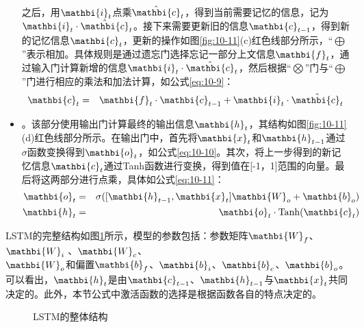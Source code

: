 \begin{itemize}
之后，用$\mathbi{i}_t$点乘$\hat{\mathbi{c}}_t$，得到当前需要记忆的信息，记为$\mathbi{i}_t \cdot  \hat{\mathbi{c}}_t$。接下来需要更新旧的信息$\mathbi{c}_{t-1}$，得到新的记忆信息$\mathbi{c}_t$，更新的操作如图\ref{fig:10-11}(c)红色线部分所示，“$\bigoplus$”表示相加。具体规则是通过遗忘门选择忘记一部分上文信息$\mathbi{f}_t$，通过输入门计算新增的信息$\mathbi{i}_t \cdot  \hat{\mathbi{c}}_t$，然后根据“$\bigotimes$”门与“$\bigoplus$”门进行相应的乘法和加法计算，如公式\eqref{eq:10-9}：
\begin{eqnarray}
\mathbi{c}_t &=& \mathbi{f}_t \cdot \mathbi{c}_{t-1} + \mathbi{i}_t  \cdot \hat{\mathbi{c}_t}
\label{eq:10-9}
\end{eqnarray}
\vspace{-1.0em}
\item {\small{}}。该部分使用输出门计算最终的输出信息$\mathbi{h}_t$，其结构如图\ref{fig:10-11}(d)红色线部分所示。在输出门中，首先将$\mathbi{x}_t$和$\mathbi{h}_{t-1}$通过$\sigma$函数变换得到$\mathbi{o}_t$，如公式\eqref{eq:10-10}。其次，将上一步得到的新记忆信息$\mathbi{c}_t$通过Tanh函数进行变换，得到值在[-1，1]范围的向量。最后将这两部分进行点乘，具体如公式\eqref{eq:10-11}：
\begin{eqnarray}
\mathbi{o}_t & = & \sigma ([\mathbi{h}_{t-1},\mathbi{x}_{t}] \mathbi{W}_o + \mathbi{b}_o ) \label{eq:10-10} \\
\mathbi{h}_t & = & \mathbi{o}_t \cdot \textrm{Tanh} (\mathbi{c}_t) \label{eq:10-11}
\end{eqnarray}
\vspace{0.5em}
\end{itemize}


\parinterval LSTM的完整结构如图\ref{fig:10-12}所示，模型的参数包括：参数矩阵$\mathbi{W}_f$、$\mathbi{W}_i$ 、$\mathbi{W}_c$、\\$\mathbi{W}_o$和偏置$\mathbi{b}_f$、$\mathbi{b}_i$、$\mathbi{b}_c$、$\mathbi{b}_o$。可以看出，$\mathbi{h}_t$是由$\mathbi{c}_{t-1}$、$\mathbi{h}_{t-1}$与$\mathbi{x}_t$共同决定的。此外，本节公式中激活函数的选择是根据函数各自的特点决定的。

\begin{figure}[htp]
\centering

\caption{LSTM的整体结构}
\label{fig:10-12}
\end{figure}


